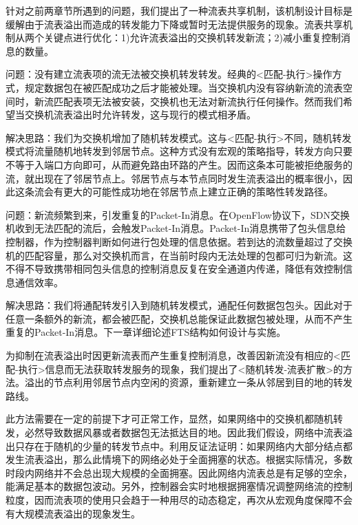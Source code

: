 
针对之前两章节所遇到的问题，我们提出了一种流表共享机制，该机制设计目标是缓解由于流表溢出而造成的转发能力下降或暂时无法提供服务的现象。流表共享机制从两个关键点进行优化：1)允许流表溢出的交换机转发新流；2)减小重复控制消息的数量。


问题：没有建立流表项的流无法被交换机转发转发。经典的<匹配-执行>操作方式，规定数据包在被匹配成功之后才能被处理。当交换机内没有容纳新流的流表空间时，新流匹配表项无法被安装，交换机也无法对新流执行任何操作。然而我们希望当交换机流表溢出时允许转发，这与现行的模式相矛盾。

解决思路：我们为交换机增加了随机转发模式。这与<匹配-执行>不同，随机转发模式将流量随机地转发到邻居节点。这种方式没有宏观的策略指导，转发方向只要不等于入端口方向即可，从而避免路由环路的产生。因而这条本可能被拒绝服务的流，就出现在了邻居节点上。邻居节点与本节点同时发生流表溢出的概率很小，因此这条流会有更大的可能性成功地在邻居节点上建立正确的策略性转发路径。




问题：新流频繁到来，引发重复的Packet-In消息。在OpenFlow协议下，SDN交换机收到无法匹配的流后，会触发Packet-In消息。Packet-In消息携带了包头信息给控制器，作为控制器判断如何进行包处理的信息依据。若到达的流数量超过了交换机的匹配容量，那么对交换机而言，在当前时段内无法处理的包都可归为新流。这不得不导致携带相同包头信息的控制消息反复在安全通道内传递，降低有效控制信息通信效率。

解决思路：我们将通配转发引入到随机转发模式，通配任何数据包包头。因此对于任意一条额外的新流，都会被匹配，交换机总能保证此数据包被处理，从而不产生重复的Packet-In消息。下一章详细论述FTS结构如何设计与实施。


为抑制在流表溢出时因更新流表而产生重复控制消息，改善因新流没有相应的<匹配-执行>信息而无法获取转发服务的现象，我们提出了<随机转发-流表扩散>的方法。溢出的节点利用邻居节点内空闲的资源，重新建立一条从邻居到目的地的转发路线。

此方法需要在一定的前提下才可正常工作，显然，如果网络中的交换机都随机转发，必然导致数据风暴或者数据包无法抵达目的地。因此我们假设，网络中流表溢出只存在于随机的少量的转发节点中。利用反证法证明：如果网络内大部分结点都发生流表溢出，那么此情境下的网络必处于全面拥塞的状态。根据实际情况，多数时段内网络并不会总出现大规模的全面拥塞。因此网络内流表总是有足够的空余，能满足基本的数据包波动。另外，控制器会实时地根据拥塞情况调整网络流的控制粒度，因而流表项的使用只会趋于一种用尽的动态稳定，再次从宏观角度保障不会有大规模流表溢出的现象发生。


